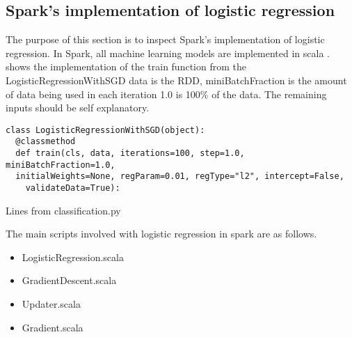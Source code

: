 \subsection{Spark's implementation of logistic regression}\label{sec:sparklogreg}
The purpose of this section is to inspect Spark’s implementation of logistic regression.
In Spark, all machine learning models are implemented in scala \cite{sparkml}. shows the implementation of the train function from the LogisticRegressionWithSGD data is the RDD, miniBatchFraction is the amount of data being used in each iteration 1.0 is 100\% of the data. The remaining inputs should be self explanatory.   
\begin{listing}[H]
\begin{verbatim}
class LogisticRegressionWithSGD(object):
  @classmethod
  def train(cls, data, iterations=100, step=1.0, miniBatchFraction=1.0,
  initialWeights=None, regParam=0.01, regType="l2", intercept=False,
    validateData=True):
\end{verbatim}
\caption{Lines from classification.py}
\label{lst:py_logreg}
\end{listing}
The main scripts involved with logistic regression in spark are as follows.
\begin{itemize}
\item LogisticRegression.scala
\item GradientDescent.scala
\item Updater.scala
\item Gradient.scala
\end{itemize}

